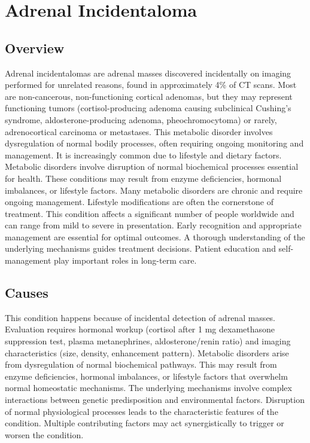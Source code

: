 \chapter{Adrenal Incidentaloma}
\label{sec:Adrenal Incidentaloma}

\section{Overview}
Adrenal incidentalomas are adrenal masses discovered incidentally on imaging performed for unrelated reasons, found in approximately 4\% of CT scans. Most are non-cancerous, non-functioning cortical adenomas, but they may represent functioning tumors (cortisol-producing adenoma causing subclinical Cushing's syndrome, aldosterone-producing adenoma, pheochromocytoma) or rarely, adrenocortical carcinoma or metastases. This metabolic disorder involves dysregulation of normal bodily processes, often requiring ongoing monitoring and management. It is increasingly common due to lifestyle and dietary factors. Metabolic disorders involve disruption of normal biochemical processes essential for health. These conditions may result from enzyme deficiencies, hormonal imbalances, or lifestyle factors. Many metabolic disorders are chronic and require ongoing management. Lifestyle modifications are often the cornerstone of treatment. This condition affects a significant number of people worldwide and can range from mild to severe in presentation. Early recognition and appropriate management are essential for optimal outcomes. A thorough understanding of the underlying mechanisms guides treatment decisions. Patient education and self-management play important roles in long-term care.
\section{Causes}
This condition happens because of incidental detection of adrenal masses. Evaluation requires hormonal workup (cortisol after 1 mg dexamethasone suppression test, plasma metanephrines, aldosterone/renin ratio) and imaging characteristics (size, density, enhancement pattern). Metabolic disorders arise from dysregulation of normal biochemical pathways. This may result from enzyme deficiencies, hormonal imbalances, or lifestyle factors that overwhelm normal homeostatic mechanisms. The underlying mechanisms involve complex interactions between genetic predisposition and environmental factors. Disruption of normal physiological processes leads to the characteristic features of the condition. Multiple contributing factors may act synergistically to trigger or worsen the condition.
